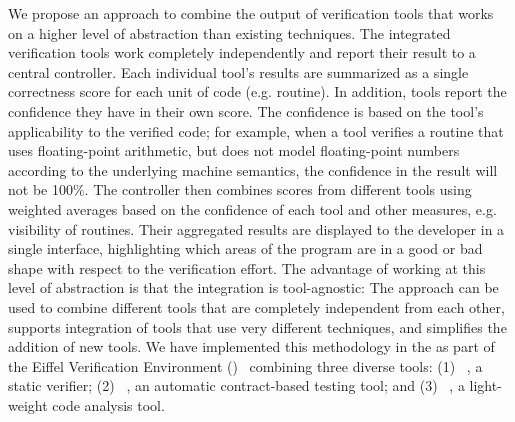 We propose an approach to combine the output of verification tools that works on a higher level of abstraction than existing techniques.
The integrated verification tools work completely independently and report their result to a central controller.
Each individual tool's results are summarized as a single correctness score for each unit of code (e.g. routine). In addition, tools report the confidence they have in their own score. The confidence is based on the tool's applicability to the verified code; for example, when a tool verifies a routine that uses floating-point arithmetic, but does not model floating-point numbers according to the underlying machine semantics, the confidence in the result will not be 100\%.
The controller then combines scores from different tools using weighted averages based on the confidence of each tool and other measures, e.g. visibility of routines.
Their aggregated results are displayed to the developer in a single interface, highlighting which areas of the program are in a good or bad shape with respect to the verification effort.
The advantage of working at this level of abstraction is that the integration is tool-agnostic:
The approach can be used to combine different tools that are completely independent from each other, supports integration of tools that use very different techniques, and simplifies the addition of new tools.
We have implemented this methodology in the \VAssist as part of the Eiffel Verification Environment (\EVE)~\cite{EVE} combining three diverse tools: (1) \AutoProof~\cite{TSCHANNEN15}, a static verifier; (2) \AutoTest~\cite{MEYER09}, an automatic contract-based testing tool; and (3) \Inspector~\cite{ZURFLUH14}, a light-weight code analysis tool.




